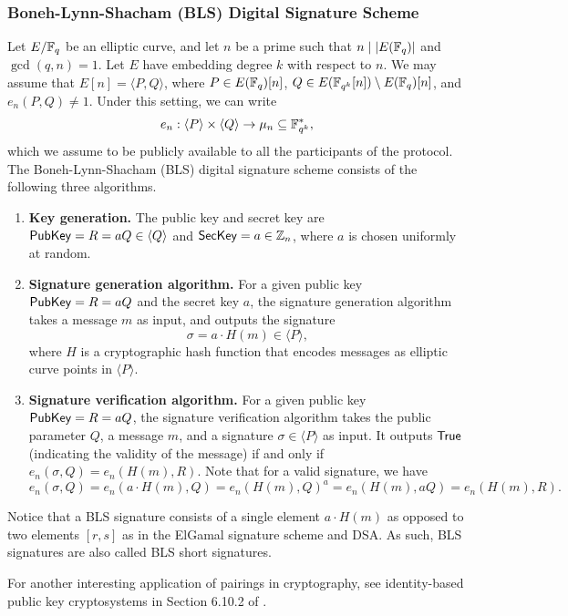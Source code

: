 \subsubsection{Boneh-Lynn-Shacham (BLS) Digital Signature Scheme}
Let $E/\mathbb{F}_q$ be an elliptic curve, and let $n$ be a prime such that 
$n \mid |E(\mathbb{F}_q)|$ and $\gcd(q, n) = 1$. Let $E$ have embedding degree $k$ 
with respect to $n$. We may assume that $E[n] = \langle P, Q \rangle$, where 
$P \in E(\mathbb{F}_q)[n]$, $Q \in E(\mathbb{F}_{q^k}[n]) \setminus E(\mathbb{F}_q)[n]$, and 
$e_n(P, Q) \neq 1$. Under this setting, we can write 
\[ e_n : \langle P \rangle \times \langle Q \rangle \to \mu_n \subseteq \mathbb{F}_{q^k}^*, \] 
which we assume to be publicly available to all the participants of the protocol. 
The Boneh-Lynn-Shacham (BLS) digital signature scheme \cite{10.1007/3-540-45682-1_30}
consists of the following three algorithms. 
\begin{enumerate}
    \item \textbf{Key generation.} The public key and secret key are 
    ${\sf PubKey} = R = aQ \in \langle Q \rangle$ and ${\sf SecKey} = a \in \mathbb{Z}_n$, where 
    $a$ is chosen uniformly at random. 
    \item \textbf{Signature generation algorithm.} For a given public key 
    ${\sf PubKey} = R = aQ$ and the secret key $a$, the signature generation algorithm 
    takes a message $m$ as input, and outputs the signature 
    \[ \sigma = a \cdot H(m) \in \langle P \rangle, \] 
    where $H$ is a cryptographic hash function that encodes messages as elliptic 
    curve points in $\langle P \rangle$.
    \item \textbf{Signature verification algorithm.} For a given public key 
    ${\sf PubKey} = R = aQ$, the signature verification algorithm takes the public 
    parameter $Q$, a message $m$, and a signature $\sigma \in \langle P \rangle$ 
    as input. It outputs ${\sf True}$ (indicating the validity of the message) if 
    and only if $e_n(\sigma, Q) = e_n(H(m), R)$. Note that for a valid signature, 
    we have 
    \[ e_n(\sigma, Q) = e_n(a \cdot H(m), Q) = e_n(H(m), Q)^a = 
    e_n(H(m), aQ) = e_n(H(m), R). \] 
\end{enumerate}
Notice that a BLS signature consists of a single element $a \cdot H(m)$ as opposed 
to two elements $[r, s]$ as in the ElGamal signature scheme and DSA. As such, 
BLS signatures are also called BLS short signatures. 

For another interesting application of pairings in cryptography, see identity-based 
public key cryptosystems in Section 6.10.2 of \cite{10.5555/1481183}.
